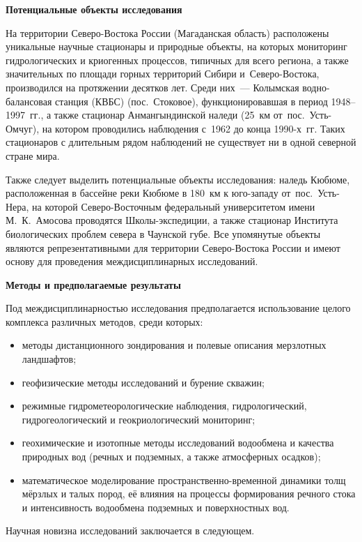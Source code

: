 

\textbf{Потенциальные объекты исследования}

На территории Северо-Востока России (Магаданская область) расположены уникальные научные стационары и природные объекты, на которых мониторинг гидрологических и криогенных процессов, типичных для всего региона, а также значительных по площади горных территорий Сибири и~Северо-Востока, производился на протяжении десятков лет. Среди них~--- Колымская водно-балансовая станция (КВБС) (пос.~Стоковое), функционировавшая в период 1948--1997~гг., а также стационар Анмангындинской наледи (25~км от~пос.~Усть-Омчуг), на котором проводились наблюдения с~1962 до конца 1990-х~гг. Таких стационаров с длительным рядом наблюдений не существует ни в одной северной стране мира.

Также следует выделить потенциальные объекты исследования: наледь Кюбюме, расположенная в бассейне реки Кюбюме в 180~км к юго-западу от~пос.~Усть-Нера, на которой Северо-Восточным федеральный университетом имени М.~К.~Амосова проводятся Школы-экспедиции, а также стационар Института биологических проблем севера в Чаунской губе. Все упомянутые объекты являются репрезентативными для территории Северо-Востока России и имеют основу для проведения междисциплинарных исследований.

\textbf{Методы и предполагаемые результаты}

Под междисциплинарностью исследования предполагается использование целого комплекса различных методов, среди которых:
\begin{itemize}[noitemsep]\vspace{-8pt}
  \item методы дистанционного зондирования и полевые описания мерзлотных ландшафтов;
  \item геофизические методы исследований и бурение скважин;
  \item режимные гидрометеорологические наблюдения, гидрологический, гидрогеологический и геокриологический мониторинг;
  \item геохимические и изотопные методы исследований водообмена и качества природных вод (речных и подземных, а также атмосферных осадков);
  \item математическое моделирование пространственно-временной динамики толщ мёрзлых и талых пород, её влияния на процессы формирования речного стока и интенсивность водообмена подземных и поверхностных вод.
\end{itemize}
 \vspace{-8pt}
Научная новизна исследований заключается в следующем.

